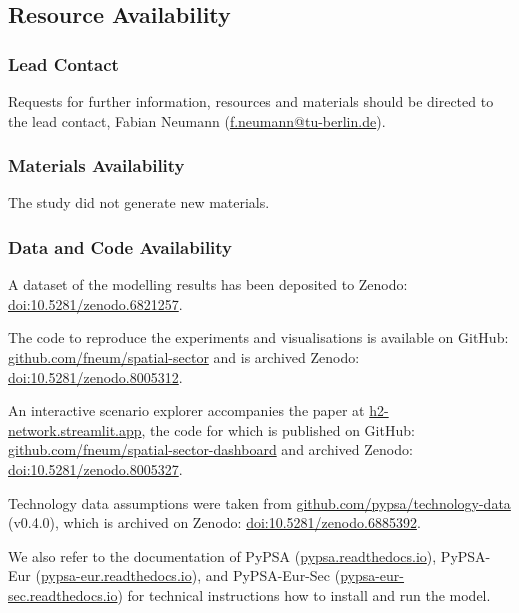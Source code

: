 \subsection*{Resource Availability}

\subsubsection*{Lead Contact}

Requests for further information, resources and materials should be directed to
the lead contact, Fabian Neumann
(\href{mailto:f.neumann@tu-berlin.de}{f.neumann@tu-berlin.de}).

\subsubsection*{Materials Availability}

The study did not generate new materials.

\subsubsection*{Data and Code Availability}

A dataset of the modelling results has been deposited to Zenodo:
\href{https://doi.org/10.5281/zenodo.6821257}{doi:10.5281/zenodo.6821257}.

The code to reproduce the experiments and visualisations is available on GitHub:
\href{https://github.com/fneum/spatial-sector}{github.com/fneum/spatial-sector}
and is archived Zenodo: \href{https://doi.org/10.5281/zenodo.8005312}{doi:10.5281/zenodo.8005312}.

An interactive scenario explorer accompanies the paper at
\href{https://h2-network.streamlit.app}{h2-network.streamlit.app}, the code for
which is published on GitHub:
\href{https://github.com/fneum/spatial-sector-dashboard}{github.com/fneum/spatial-sector-dashboard}
and archived Zenodo: \href{https://doi.org/10.5281/zenodo.8005327}{doi:10.5281/zenodo.8005327}.

Technology data assumptions were taken from
\href{https://github.com/pypsa/technology-data}{github.com/pypsa/technology-data}
(v0.4.0), which is archived on Zenodo: \href{https://doi.org/10.5281/zenodo.6885392}{doi:10.5281/zenodo.6885392}.

We also refer to the documentation of PyPSA
(\href{https://pypsa.readthedocs.io}{pypsa.readthedocs.io}), PyPSA-Eur
(\href{https://pypsa-eur.readthedocs.io}{pypsa-eur.readthedocs.io}), and
PyPSA-Eur-Sec
(\href{https://pypsa-eur-sec.readthedocs.io}{pypsa-eur-sec.readthedocs.io})
for technical instructions how to install and run the model.


